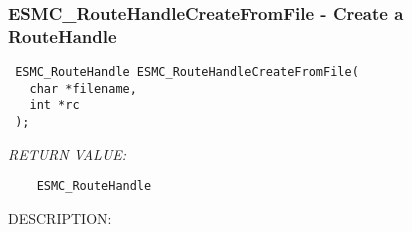 
\setlength{\oldparskip}{\parskip}
\setlength{\parskip}{1.5ex}
\setlength{\oldparindent}{\parindent}
\setlength{\parindent}{0pt}
\setlength{\oldbaselineskip}{\baselineskip}
\setlength{\baselineskip}{11pt}
 
\def\bv{\begin{verbatim}}
\def\ev{\end{verbatim}}
\def\be{\begin{equation}}
\def\ee{\end{equation}}
\def\bea{\begin{eqnarray}}
\def\eea{\end{eqnarray}}
\def\bi{\begin{itemize}}
\def\ei{\end{itemize}}
\def\bn{\begin{enumerate}}
\def\en{\end{enumerate}}
\def\bd{\begin{description}}
\def\ed{\end{description}}
\def\({\left (}
\def\){\right )}
\def\[{\left [}
\def\]{\right ]}
\def\<{\left  \langle}
\def\>{\right \rangle}
\def\cI{{\cal I}}
\def\diag{\mathop{\rm diag}}
\def\tr{\mathop{\rm tr}}


 
\subsubsection [ESMC\_RouteHandleCreateFromFile] {ESMC\_RouteHandleCreateFromFile - Create a RouteHandle}


  
\begin{verbatim} ESMC_RouteHandle ESMC_RouteHandleCreateFromFile(
   char *filename,
   int *rc
 );\end{verbatim}{\em RETURN VALUE:}
\begin{verbatim}    ESMC_RouteHandle\end{verbatim}
{\sf DESCRIPTION:\\ }


